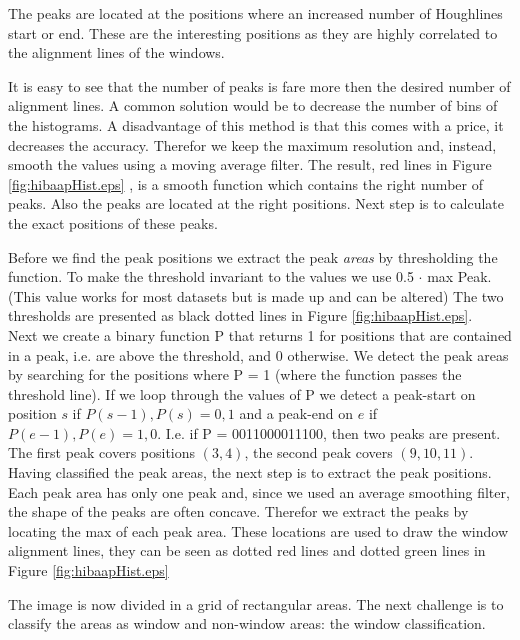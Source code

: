 The peaks are located at the positions where an increased number of Houghlines
start or end.  These are the interesting positions as they are highly correlated
to the alignment lines of the windows. 

It is easy to see that the number of peaks is fare more then the desired number of alignment lines.
A common solution would be to decrease the number of bins of the histograms. A
disadvantage of this method is that this comes with a price, it decreases the accuracy. Therefor
we keep the maximum resolution and, instead, smooth the values using a moving average filter.
The result, red lines in Figure \ref{fig:hibaapHist.eps}
, is a smooth function which contains the right number of peaks. Also the peaks
are located at the right positions. Next step is to calculate the exact
positions of these peaks.

Before we find the peak positions we extract the peak \emph{areas} by thresholding the
function. To make the threshold invariant to the values we use 0.5 $\cdot$ max Peak. 
(This value works for most datasets but is made up and can be altered)
The two thresholds are presented as black dotted lines in Figure \ref{fig:hibaapHist.eps}.\\
Next we create a binary function P that returns 1 for positions that are contained in
a peak, i.e. are above the threshold, and 0 otherwise.
We detect the peak areas by searching for the positions where P = 1
(where the function passes the threshold line). 
If we loop through the values of P we detect a peak-start on position $s$ if ${P(s-1),P(s)}={0,1}$
and a peak-end on $e$ if ${P(e-1),P(e)}={1,0}$. 
I.e. if P = 0011000011100, then two peaks are present. The first peak covers positions $(3,4)$, 
the second peak covers $(9,10,11)$.\\

Having classified the peak areas, the next step is to extract the peak positions. 
Each peak area has only one peak and, since we used an average smoothing filter, the shape of 
the peaks are often concave. Therefor we extract the peaks by locating the max of each peak area. 
These locations are used to draw the window alignment lines, they can be seen
as dotted red lines and dotted green lines in Figure \ref{fig:hibaapHist.eps}

The image is now divided in a grid of rectangular areas. The next challenge is to 
classify the areas as window and non-window areas: the window classification.

